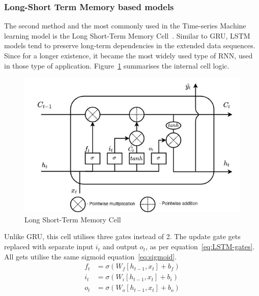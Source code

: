 \subsubsection{Long-Short Term Memory based models} \label{subsub:lstm}
The second method and the most commonly used in the Time-series Machine learning model is the Long Short-Term Memory Cell~\cite{LSTM_Hochreiter1997}.
Similar to GRU, LSTM models tend to preserve long-term dependencies in the extended data sequences.
Since for a longer existence, it became the most widely used type of RNN, used in those type of application.
Figure~\ref{fig:LSTM-cell} summarises the internal cell logic.
\begin{figure}[ht]%
    \centering
    \includegraphics[width=0.7\linewidth]{II_Body/LSTM/images/LSTM.jpg}
    \caption{Long Short-Term Memory Cell}
    \label{fig:LSTM-cell}
\end{figure}
Unlike GRU, this cell utilises three gates instead of 2.
The update gate gets replaced with separate input $i_t$ and output $o_t$, as per equation~\ref{eq:LSTM-gates}.
All gets utilise the same sigmoid equation~\ref{eq:sigmoid}.
\begin{equation}
    \begin{split}
        f_t &= \sigma \left(W_f \left[h_{t-1}, x_t \right] + b_f \right) \\
        i_t &= \sigma \left(W_i \left[h_{t-1}, x_t \right] + b_i \right) \\
        o_t &= \sigma \left(W_o \left[h_{t-1}, x_t \right] + b_o \right) \\    
    \end{split}
    \label{eq:LSTM-gates}
\end{equation}
